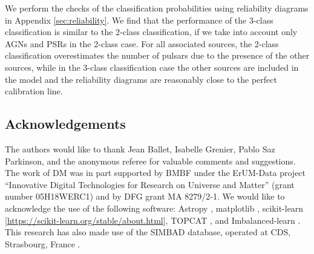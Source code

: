 \documentclass{aa}
\begin{document}
We perform the checks of the classification probabilities using reliability diagrams in Appendix \ref{sec:reliability}. 
We find that the performance of the 3-class classification is similar to the 2-class classification, if we take into account only AGNs and PSRs in the 2-class case. For all associated sources, the 2-class classification overestimates the number of pulsars due to the presence of the
other sources, while in the 3-class classification case the other sources are included in the model and the reliability diagrams are reasonably close to the perfect calibration line.

\subsection*{Acknowledgements}

The authors would like to thank Jean Ballet, Isabelle Grenier, Pablo Saz Parkinson, and the anonymous referee for valuable comments and suggestions.
The work of DM was in part supported by BMBF under the ErUM-Data project ``Innovative Digital Technologies for Research on Universe and Matter'' (grant number 05H18WERC1) and by DFG grant MA 8279/2-1.
We would like to acknowledge the use of the following software:
Astropy \citep[\url{http://www.astropy.org},][]{2013A&A...558A..33A}, 
matplotlib \citep{Hunter:2007}, 
scikit-learn [\url{https://scikit-learn.org/stable/about.html}], 
TOPCAT \citep{2005ASPC..347...29T}, and Imbalanced-learn \cite{JMLR:v18:16-365}.
This research has also made use of the SIMBAD database,
operated at CDS, Strasbourg, France \citep{2000A&AS..143....9W}.

  
\end{document}
